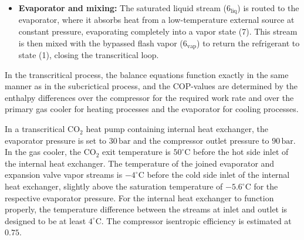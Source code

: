 \begin{itemize}
    \item[6--1] \textbf{Evaporator and mixing:} The saturated liquid stream ($6_\text{liq}$) is routed to the evaporator, where it absorbs heat from a low-temperature external source at constant pressure, evaporating completely into a vapor state (7). This stream is then mixed with the bypassed flash vapor ($6_\text{vap}$) to return the refrigerant to state (1), closing the transcritical loop.
\end{itemize}

In the transcritical process, the balance equations function exactly in the same manner as in the subcrictical process, and the COP-values are determined by the enthalpy differences over the compressor for the required work rate and over the primary gas cooler for heating processes and the evaporator for cooling processes. 
\begin{example}
    In a transcritical CO$_2$ heat pump containing internal heat exchanger, the evaporator pressure is set to $30\,\text{bar}$ and the compressor outlet pressure to $90\,\text{bar}$. In the gas cooler, the CO$_2$ exit temperature is $50^\circ\text{C}$ before the hot side inlet of the internal heat exchanger. The temperature of the joined evaporator and expansion valve vapor streams is $-4^\circ\text{C}$ before the cold side inlet of the internal heat exchanger, slightly above the saturation temperature of $-5.6^\circ\text{C}$ for the respective evaporator pressure. For the internal heat exchanger to function properly, the temperature difference between the streams at inlet and outlet is designed to be at least $4^\circ\text{C}$. The compressor isentropic efficiency is estimated at $0.75$.


\end{example}
